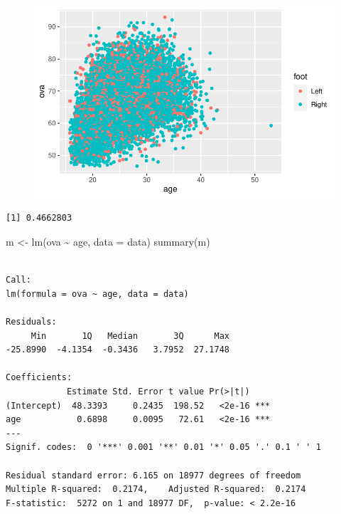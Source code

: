 \documentclass[
  letterpaper,
  DIV=11,
  numbers=noendperiod]{scrartcl}
\newenvironment{Shaded}{\begin{snugshade}}{\end{snugshade}}
\newcommand{\AttributeTok}[1]{\textcolor[rgb]{0.40,0.45,0.13}{#1}}
\newcommand{\FunctionTok}[1]{\textcolor[rgb]{0.28,0.35,0.67}{#1}}
\newcommand{\NormalTok}[1]{\textcolor[rgb]{0.00,0.23,0.31}{#1}}
\newcommand{\OtherTok}[1]{\textcolor[rgb]{0.00,0.23,0.31}{#1}}
\newcommand{\SpecialCharTok}[1]{\textcolor[rgb]{0.37,0.37,0.37}{#1}}
\begin{document}
\begin{figure}[H]

{\centering \includegraphics{FIFA21_files/figure-pdf/unnamed-chunk-10-1.pdf}

}

\end{figure}

\begin{Shaded}
\end{Shaded}

\begin{verbatim}
[1] 0.4662803
\end{verbatim}

\begin{Shaded}
\begin{Highlighting}[]
\NormalTok{m }\OtherTok{\textless{}{-}} \FunctionTok{lm}\NormalTok{(ova }\SpecialCharTok{\textasciitilde{}}\NormalTok{ age, }\AttributeTok{data =}\NormalTok{ data)}
\FunctionTok{summary}\NormalTok{(m)}
\end{Highlighting}
\end{Shaded}

\begin{verbatim}

Call:
lm(formula = ova ~ age, data = data)

Residuals:
     Min       1Q   Median       3Q      Max 
-25.8990  -4.1354  -0.3436   3.7952  27.1748 

Coefficients:
            Estimate Std. Error t value Pr(>|t|)    
(Intercept)  48.3393     0.2435  198.52   <2e-16 ***
age           0.6898     0.0095   72.61   <2e-16 ***
---
Signif. codes:  0 '***' 0.001 '**' 0.01 '*' 0.05 '.' 0.1 ' ' 1

Residual standard error: 6.165 on 18977 degrees of freedom
Multiple R-squared:  0.2174,    Adjusted R-squared:  0.2174 
F-statistic:  5272 on 1 and 18977 DF,  p-value: < 2.2e-16
\end{verbatim}
\end{document}
